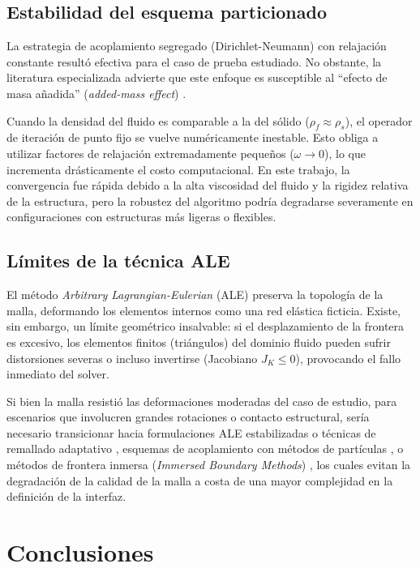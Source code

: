 \documentclass[12pt, letterpaper]{report}
\theoremstyle{definition}
\begin{document}
\subsection{Estabilidad del esquema particionado}

La estrategia de acoplamiento segregado (Dirichlet-Neumann) con relajación constante resultó efectiva para el caso de prueba estudiado. No obstante, la literatura especializada advierte que este enfoque es susceptible al ``efecto de masa añadida'' (\textit{added-mass effect}) \cite{causin2005added}.

Cuando la densidad del fluido es comparable a la del sólido ($\rho_f \approx \rho_s$), el operador de iteración de punto fijo se vuelve numéricamente inestable. Esto obliga a utilizar factores de relajación extremadamente pequeños ($\omega \to 0$), lo que incrementa drásticamente el costo computacional. En este trabajo, la convergencia fue rápida debido a la alta viscosidad del fluido y la rigidez relativa de la estructura, pero la robustez del algoritmo podría degradarse severamente en configuraciones con estructuras más ligeras o flexibles.

\subsection{Límites de la técnica ALE}

El método \textit{Arbitrary Lagrangian-Eulerian} (ALE) preserva la topología de la malla, deformando los elementos internos como una red elástica ficticia. Existe, sin embargo, un límite geométrico insalvable: si el desplazamiento de la frontera es excesivo, los elementos finitos (triángulos) del dominio fluido pueden sufrir distorsiones severas o incluso invertirse (Jacobiano $J_K \le 0$), provocando el fallo inmediato del solver.

Si bien la malla resistió las deformaciones moderadas del caso de estudio, para escenarios que involucren grandes rotaciones o contacto estructural, sería necesario transicionar hacia formulaciones ALE estabilizadas o técnicas de remallado adaptativo \cite{gao2025stabilized}, esquemas de acoplamiento con métodos de partículas \cite{yao2023improved}, o métodos de frontera inmersa (\textit{Immersed Boundary Methods}) \cite{kolahdouz2023sharp, wang2025three}, los cuales evitan la degradación de la calidad de la malla a costa de una mayor complejidad en la definición de la interfaz.

\section{Conclusiones}
\end{document}
